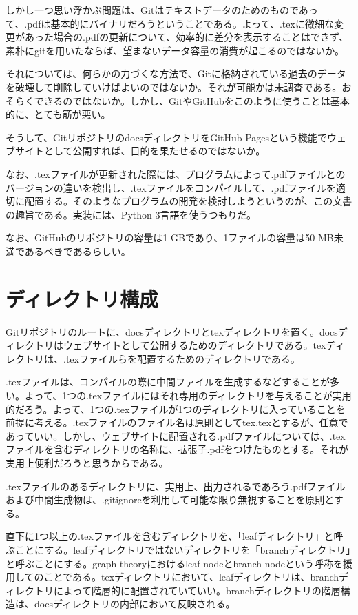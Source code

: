 \documentclass[uplatex,dvipdfmx]{jsarticle} \usepackage{amsmath,amssymb,bm}
\begin{document}
しかし一つ思い浮かぶ問題は、Gitはテキストデータのためのものであって、.pdfは基本的にバイナリだろうということである。よって、.texに微細な変更があった場合の.pdfの更新について、効率的に差分を表示することはできず、素朴にgitを用いたならば、望まないデータ容量の消費が起こるのではないか。

それについては、何らかの力づくな方法で、Gitに格納されている過去のデータを破壊して削除していけばよいのではないか。それが可能かは未調査である。おそらくできるのではないか。しかし、GitやGitHubをこのように使うことは基本的に、とても筋が悪い。

そうして、GitリポジトリのdocsディレクトリをGitHub Pagesという機能でウェブサイトとして公開すれば、目的を果たせるのではないか。

なお、.texファイルが更新された際には、プログラムによって.pdfファイルとのバージョンの違いを検出し、.texファイルをコンパイルして、.pdfファイルを適切に配置する。そのようなプログラムの開発を検討しようというのが、この文書の趣旨である。実装には、Python 3言語を使うつもりだ。

なお、GitHubのリポジトリの容量は1 GBであり、1ファイルの容量は50 MB未満であるべきであるらしい。



\section*{ディレクトリ構成}
Gitリポジトリのルートに、docsディレクトリとtexディレクトリを置く。docsディレクトリはウェブサイトとして公開するためのディレクトリである。texディレクトリは、.texファイルらを配置するためのディレクトリである。

.texファイルは、コンパイルの際に中間ファイルを生成するなどすることが多い。よって、1つの.texファイルにはそれ専用のディレクトリを与えることが実用的だろう。よって、1つの.texファイルが1つのディレクトリに入っていることを前提に考える。.texファイルのファイル名は原則としてtex.texとするが、任意であっていい。しかし、ウェブサイトに配置される.pdfファイルについては、.texファイルを含むディレクトリの名称に、拡張子.pdfをつけたものとする。それが実用上便利だろうと思うからである。

.texファイルのあるディレクトリに、実用上、出力されるであろう.pdfファイルおよび中間生成物は、.gitignoreを利用して可能な限り無視することを原則とする。

直下に1つ以上の.texファイルを含むディレクトリを、「leafディレクトリ」と呼ぶことにする。leafディレクトリではないディレクトリを「branchディレクトリ」と呼ぶことにする。graph theoryにおけるleaf nodeとbranch nodeという呼称を援用してのことである。texディレクトリにおいて、leafディレクトリは、branchディレクトリによって階層的に配置されていていい。branchディレクトリの階層構造は、docsディレクトリの内部において反映される。
\end{document}
